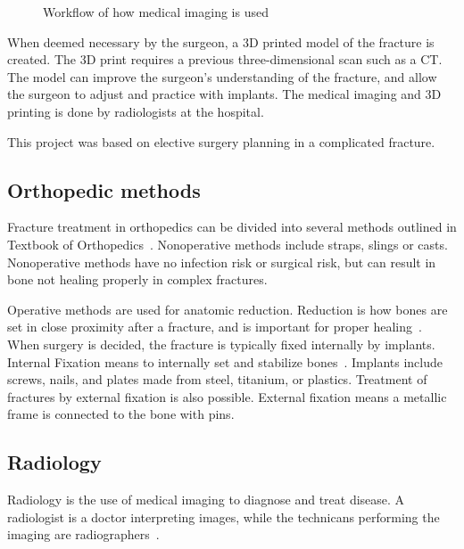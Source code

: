 \documentclass[a4paper]{report}
\begin{document}
\begin{figure}[h!]
    \centering
	\hfill
  \caption{Workflow of how medical imaging is used}
  \label{flow}
  \small
\end{figure}

When deemed necessary by the surgeon, a 3D printed model of the fracture is created. The 3D print requires a previous three-dimensional scan such as a CT. The model can improve the surgeon's understanding of the fracture, and allow the surgeon to adjust and practice with implants. The medical imaging and 3D printing is done by radiologists at the hospital.

This project was based on elective surgery planning in a complicated fracture.

\subsection{Orthopedic methods}

Fracture treatment in orthopedics can be divided into several methods outlined in Textbook of Orthopedics~\cite{ebnezar_textbook_2016}.
Nonoperative methods include straps, slings or casts.
Nonoperative methods have no infection risk or surgical risk, but can result in bone not healing properly in complex fractures.

Operative methods are used for anatomic reduction. Reduction is how bones are set in close proximity after a fracture, and is important for proper healing~\cite{verywell}.
When surgery is decided, the fracture is typically fixed internally by implants.
Internal Fixation means to internally set and stabilize bones~\cite{ebnezar_textbook_2016}.
Implants include screws, nails, and plates made from steel, titanium, or plastics.
Treatment of fractures by external fixation is also possible. External fixation means a metallic frame is connected to the bone with pins.

\subsection{Radiology}
Radiology is the use of medical imaging to diagnose and treat disease. A radiologist is a doctor interpreting images, while the technicans performing the imaging are radiographers~\cite{swiontkowski_manual_2013}.
\end{document}
